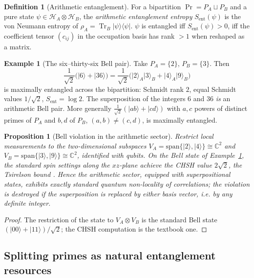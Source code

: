 \documentclass[11pt,a4paper]{article}
\theoremstyle{plain}
\newtheorem{proposition}[theorem]{Proposition}
\theoremstyle{definition}
\newtheorem{definition}[theorem]{Definition}
\newtheorem{example}[theorem]{Example}
\theoremstyle{remark}
\newcommand{\ket}[1]{\lvert #1\rangle}
\newcommand{\bra}[1]{\langle #1\rvert}
\newcommand{\Cc}{\mathbb{C}}
\newcommand{\Hil}{\mathcal{H}}
\DeclareMathOperator{\Tr}{Tr}
\begin{document}
\begin{definition}[Arithmetic entanglement]\label{def:arithmeticent}
For a bipartition $\Pr=P_{A}\sqcup P_{B}$ and a pure state
$\psi\in\Hil_{A}\otimes\Hil_{B}$, the \emph{arithmetic entanglement entropy}
$S_{\mathrm{ent}}(\psi)$ is the von Neumann entropy of
$\rho_{A}=\Tr_{B}\ket{\psi}\bra{\psi}$. $\psi$ is entangled iff
$S_{\mathrm{ent}}(\psi)>0$, iff the coefficient tensor
$(c_{ij})$ in the occupation basis has rank $>1$ when reshaped as a matrix.
\end{definition}

\begin{example}[The six--thirty-six Bell pair]\label{ex:bellpair}
Take $P_{A}=\{2\}$, $P_{B}=\{3\}$. Then
\begin{equation}
\frac{1}{\sqrt2}\bigl(\ket{6}+\ket{36}\bigr)
=\frac{1}{\sqrt2}\bigl(\ket{2}_{A}\ket{3}_{B}+\ket{4}_{A}\ket{9}_{B}\bigr)
\end{equation}
is maximally entangled across the bipartition: Schmidt rank $2$, equal Schmidt values
$1/\sqrt2$, $S_{\mathrm{ent}}=\log2$. The superposition of the integers $6$ and $36$ \emph{is}
an arithmetic Bell pair. More generally
$\frac{1}{\sqrt2}(\ket{ab}+\ket{cd})$ with $a,c$ powers of distinct primes of $P_{A}$ and
$b,d$ of $P_{B}$, $(a,b)\neq(c,d)$, is maximally entangled.
\end{example}

\begin{proposition}[Bell violation in the arithmetic sector]\label{prop:chsh}
Restrict local measurements to the two-dimensional subspaces
$V_{A}=\mathrm{span}\{\ket{2},\ket{4}\}\cong\Cc^{2}$ and
$V_{B}=\mathrm{span}\{\ket{3},\ket{9}\}\cong\Cc^{2}$, identified with qubits. On the Bell
state of Example~\ref{ex:bellpair}, the standard spin settings along the $xz$-plane achieve
the CHSH value $2\sqrt2$, the Tsirelson bound \cite{chsh1969,bell1964}. Hence the arithmetic
sector, equipped with superpositional states, exhibits exactly standard quantum
non-locality of correlations; the violation is destroyed if the superposition is replaced by
either basis vector, i.e. by any definite integer.
\end{proposition}

\begin{proof}
The restriction of the state to $V_{A}\otimes V_{B}$ is the standard Bell state
$(\ket{00}+\ket{11})/\sqrt2$; the CHSH computation is the textbook one.
\end{proof}

\subsection{Splitting primes as natural entanglement resources}
\end{document}
